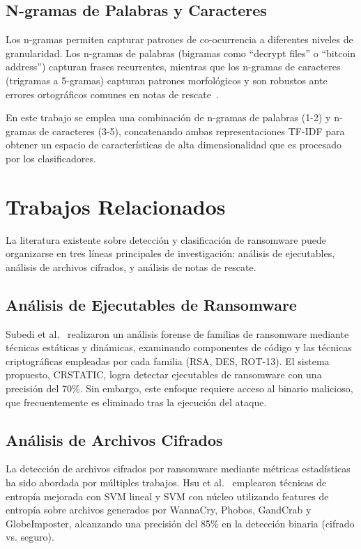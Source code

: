 \subsection{N-gramas de Palabras y Caracteres}

Los n-gramas permiten capturar patrones de co-ocurrencia a diferentes niveles de granularidad. Los n-gramas de palabras (bigramas como ``decrypt files'' o ``bitcoin address'') capturan frases recurrentes, mientras que los n-gramas de caracteres (trigramas a 5-gramas) capturan patrones morfológicos y son robustos ante errores ortográficos comunes en notas de rescate~\cite{paper_5_note_files}.

En este trabajo se emplea una combinación de n-gramas de palabras (1-2) y n-gramas de caracteres (3-5), concatenando ambas representaciones TF-IDF para obtener un espacio de características de alta dimensionalidad que es procesado por los clasificadores.

\section{Trabajos Relacionados}

La literatura existente sobre detección y clasificación de ransomware puede organizarse en tres líneas principales de investigación: análisis de ejecutables, análisis de archivos cifrados, y análisis de notas de rescate.

\subsection{Análisis de Ejecutables de Ransomware}

Subedi et al.~\cite{paper_1_forensic} realizaron un análisis forense de familias de ransomware mediante técnicas estáticas y dinámicas, examinando componentes de código y las técnicas criptográficas empleadas por cada familia (RSA, DES, ROT-13). El sistema propuesto, CRSTATIC, logra detectar ejecutables de ransomware con una precisión del 70\%. Sin embargo, este enfoque requiere acceso al binario malicioso, que frecuentemente es eliminado tras la ejecución del ataque.

\subsection{Análisis de Archivos Cifrados}

La detección de archivos cifrados por ransomware mediante métricas estadísticas ha sido abordada por múltiples trabajos. Hsu et al.~\cite{paper_3_enhancing_file_entropy} emplearon técnicas de entropía mejorada con SVM lineal y SVM con núcleo utilizando features de entropía sobre archivos generados por WannaCry, Phobos, GandCrab y GlobeImposter, alcanzando una precisión del 85\% en la detección binaria (cifrado vs. seguro).

